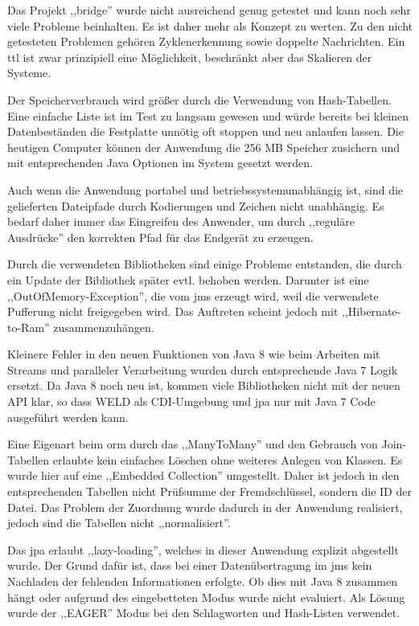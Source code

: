 \documentclass[oneside, ngerman, toc=bibliography,bibliography=totoc,listof=entryprefix, open=right,numbers=noenddot,fontsize=12pt]{scrbook}
\begin{document}
Das Projekt ,,bridge'' wurde nicht ausreichend genug getestet und kann noch sehr viele Probleme beinhalten. Es ist daher mehr als Konzept zu werten. Zu den nicht getesteten Problemen gehören Zyklenerkennung sowie doppelte Nachrichten. Ein \acrshort{ttl} ist zwar prinzipiell eine Möglichkeit, beschränkt aber das Skalieren der Systeme.

Der Speicherverbrauch wird größer durch die Verwendung von Hash-Tabellen. Eine einfache Liste ist im Test zu langsam gewesen und würde bereits bei kleinen Datenbeständen die Festplatte unnötig oft stoppen und neu anlaufen lassen. Die heutigen Computer können der Anwendung die 256 MB Speicher zusichern und mit entsprechenden Java Optionen im System gesetzt werden.

Auch wenn die Anwendung portabel und betriebssystemunabhängig ist, sind die gelieferten Dateipfade durch Kodierungen und Zeichen nicht unabhängig. Es bedarf daher immer das Eingreifen des Anwender, um durch ,,reguläre Ausdrücke'' den korrekten Pfad für das Endgerät zu erzeugen.

Durch die verwendeten Bibliotheken sind einige Probleme entstanden, die durch ein Update der Bibliothek später evtl. behoben werden. Darunter ist eine ,,OutOfMemory-Exception'', die vom \acrshort{jms} erzeugt wird, weil die verwendete Pufferung nicht freigegeben wird. Das Auftreten scheint jedoch mit ,,Hibernate-to-Ram'' zusammenzuhängen. 

Kleinere Fehler in den neuen Funktionen von Java 8 wie beim Arbeiten mit Streams und paralleler Verarbeitung wurden durch entsprechende Java 7 Logik ersetzt. Da Java 8 noch neu ist, kommen viele Bibliotheken nicht mit der neuen API klar, so dass WELD als CDI-Umgebung und \acrshort{jpa} nur mit Java 7 Code ausgeführt werden kann.

Eine Eigenart beim \acrshort{orm} durch das ,,ManyToMany'' und den Gebrauch von Join-Tabellen  erlaubte kein einfaches Löschen ohne weiteres Anlegen von Klassen. Es wurde hier auf eine ,,Embedded Collection'' umgestellt. Daher ist jedoch in den entsprechenden Tabellen nicht Prüfsumme der Fremdschlüssel, sondern die ID der Datei. Das Problem der Zuordnung wurde dadurch in der Anwendung realisiert, jedoch sind die Tabellen nicht ,,normalisiert''.

Das \acrshort{jpa}  erlaubt ,,lazy-loading'', welches in dieser Anwendung explizit  abgestellt wurde.
Der Grund dafür ist, dass bei einer Datenübertragung im \acrshort{jms}  kein Nachladen der fehlenden Informationen erfolgte. Ob dies mit Java 8 zusammen hängt oder aufgrund des eingebetteten Modus wurde nicht evaluiert. Als Lösung wurde der ,,EAGER'' Modus bei den Schlagworten und Hash-Listen verwendet.
\end{document}
